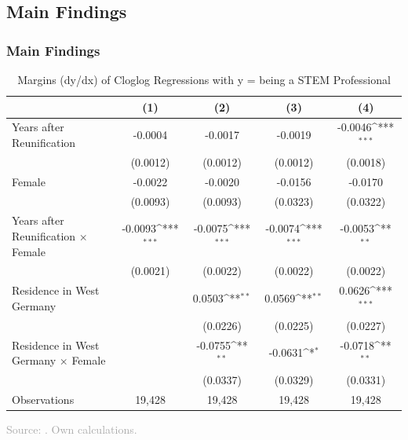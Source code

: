 \documentclass[11pt, aspectratio=1610, xcolor={dvipsnames}]{beamer}
\def\sym#1{\ifmmode^{#1}\else\(^{#1}\)\fi}
\begin{document}
	\subsection{Main Findings}
	\begin{frame}
		\frametitle{Main Findings}
		
		{\linespread{1}\tiny
			\begin{table}[h]
				\centering
				\caption{Margins (dy/dx) of Cloglog Regressions with y = being a STEM Professional}
				\label{tab:margins1}
				\begin{tabular}{l*{4}{c}}
					\toprule
					&\multicolumn{1}{c}{(1)}         &\multicolumn{1}{c}{(2)}         &\multicolumn{1}{c}{(3)}         &\multicolumn{1}{c}{(4)}         \\
					\midrule
					Years after Reunification&     -0.0004         &     -0.0017         &     -0.0019         &     -0.0046\sym{***}\\
					&    (0.0012)         &    (0.0012)         &    (0.0012)         &    (0.0018)         \\
					\addlinespace
					Female              &     -0.0022         &     -0.0020         &     -0.0156         &     -0.0170         \\
					&    (0.0093)         &    (0.0093)         &    (0.0323)         &    (0.0322)         \\
					\addlinespace
					Years after Reunification $\times$ Female&     -0.0093\sym{***}&     -0.0075\sym{***}&     -0.0074\sym{***}&     -0.0053\sym{**} \\
					&    (0.0021)         &    (0.0022)         &    (0.0022)         &    (0.0022)         \\
					\midrule
					Residence in West Germany&                     &      0.0503\sym{**} &      0.0569\sym{**} &      0.0626\sym{***}\\
					&                     &    (0.0226)         &    (0.0225)         &    (0.0227)         \\
					\addlinespace
					Residence in West Germany $\times$ Female&                     &     -0.0755\sym{**} &     -0.0631\sym{*}  &     -0.0718\sym{**} \\
					&                     &    (0.0337)         &    (0.0329)         &    (0.0331)         \\
					\midrule
					Observations        &       19,428         &       19,428         &       19,428         &       19,428         \\
					\bottomrule
				\end{tabular}
			\end{table}
		}
		
		{\scriptsize
			\textcolor{darkgray}{Source: \cite{SOEP2023}. Own calculations.}
		}
		
		\hyperlink{graph}{}
		
	\end{frame}
	
\end{document}
